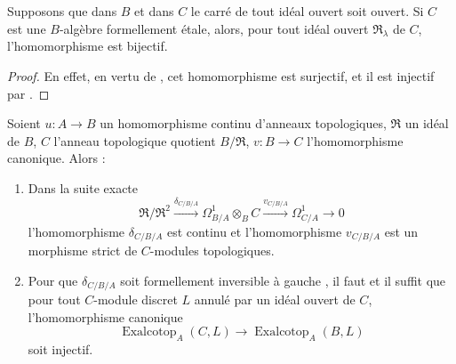 \begin{corollary}[20.7.7]
\label{0.20.7.7-fr}
Supposons que dans $B$ et dans $C$ le carré de tout idéal ouvert soit ouvert.
Si $C$ est une $B$-algèbre formellement étale, alors, pour tout idéal ouvert
$\mathfrak{R}_\lambda$ de $C$, l'homomorphisme  est
bijectif.
\end{corollary}

\begin{proof}
En effet, en vertu de , cet homomorphisme est surjectif, et
il est injectif par .
\end{proof}

\begin{proposition}[20.7.8]
\label{0.20.7.8-fr}
Soient $u:A\to B$ un homomorphisme continu d'anneaux topologiques,
$\mathfrak{R}$ un idéal de $B$, $C$ l'anneau topologique quotient
$B/\mathfrak{R}$, $v:B\to C$ l'homomorphisme canonique. Alors :
\begin{enumerate}
  \item[\rm(i)] Dans la suite exacte 
\[
  \mathfrak{R}/\mathfrak{R}^2\xrightarrow{\delta_{C/B/A}}
  \Omega^1_{B/A}\otimes_B C\xrightarrow{v_{C/B/A}}\Omega^1_{C/A}\to0
\]
l'homomorphisme $\delta_{C/B/A}$ est continu et l'homomorphisme $v_{C/B/A}$
est un morphisme strict de $C$-modules topologiques.
  \item[\rm(ii)] Pour que $\delta_{C/B/A}$ soit formellement inversible à
gauche , il faut et il suffit que pour tout $C$-module
discret $L$ annulé par un idéal ouvert de $C$, l'homomorphisme canonique
\begin{equation}
\tag{20.7.8.1}
\label{0.20.7.8.1-fr}
  \operatorname{Exalcotop}_A(C,L)\to\operatorname{Exalcotop}_A(B,L)
\end{equation}
soit injectif.
\end{enumerate}
\end{proposition}

